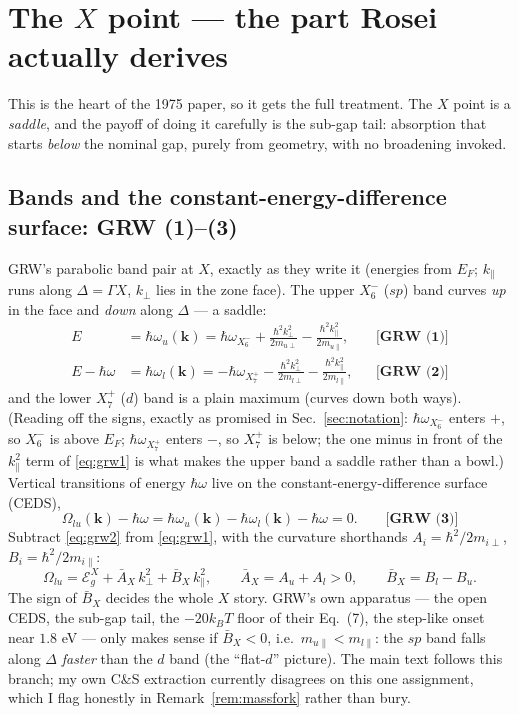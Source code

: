 \documentclass[11pt,a4paper]{article}
\numberwithin{equation}{section}
\newcommand{\hw}{\hbar\omega}
\newcommand{\EgX}{\mathcal{E}_g^{X}}
\newcommand{\AX}{\bar{A}_X}
\newcommand{\BX}{\bar{B}_X}
\newcommand{\kperp}{k_{\perp}}
\newcommand{\kpar}{k_{\parallel}}
\newcommand{\wXsix}{\hbar\omega_{X_6^-}}
\newcommand{\wXseven}{\hbar\omega_{X_7^+}}
\newcommand{\grweq}[1]{\textbf{[GRW~(#1)]}}
\begin{document}
\section{The $X$ point --- the part Rosei actually derives}\label{sec:X}

This is the heart of the 1975 paper, so it gets the full treatment.
The $X$ point is a \emph{saddle}, and the payoff of doing it carefully
is the sub-gap tail: absorption that starts \emph{below} the nominal
gap, purely from geometry, with no broadening invoked.

\subsection{Bands and the constant-energy-difference surface: GRW (1)--(3)}

GRW's parabolic band pair at $X$, exactly as they write it (energies
from $E_F$; $\kpar$ runs along $\Delta=\Gamma X$, $\kperp$ lies in the
zone face). The upper $X_6^-$ ($sp$) band curves \emph{up} in the face
and \emph{down} along $\Delta$ --- a saddle:
\begin{align}
E&=\hbar\omega_u(\mathbf k)
=\wXsix+\frac{\hbar^2\kperp^2}{2m_{u\perp}}
        -\frac{\hbar^2\kpar^2}{2m_{u\parallel}},
&&\grweq{1}
\label{eq:grw1}\\[2pt]
E-\hw&=\hbar\omega_l(\mathbf k)
=-\wXseven-\frac{\hbar^2\kperp^2}{2m_{l\perp}}
          -\frac{\hbar^2\kpar^2}{2m_{l\parallel}},
&&\grweq{2}
\label{eq:grw2}
\end{align}
and the lower $X_7^+$ ($d$) band is a plain maximum (curves down both
ways). (Reading off the signs, exactly as promised in
Sec.~\ref{sec:notation}: $\wXsix$ enters $+$, so $X_6^-$ is above
$E_F$; $\wXseven$ enters $-$, so $X_7^+$ is below; the one minus in
front of the $\kpar^2$ term of \eqref{eq:grw1} is what makes the upper
band a saddle rather than a bowl.) Vertical transitions of energy
$\hw$ live on the constant-energy-difference surface (CEDS),
\begin{equation}
\Omega_{lu}(\mathbf k)-\hw=
\hbar\omega_u(\mathbf k)-\hbar\omega_l(\mathbf k)-\hw=0 .
\qquad\grweq{3}
\label{eq:grw3}
\end{equation}
Subtract \eqref{eq:grw2} from \eqref{eq:grw1}, with the curvature
shorthands $A_i=\hbar^2/2m_{i\perp}$, $B_i=\hbar^2/2m_{i\parallel}$:
\begin{equation}
\Omega_{lu}=\EgX+\AX\,\kperp^2+\BX\,\kpar^2,
\qquad
\AX=A_u+A_l>0,\qquad
\BX=B_l-B_u .
\label{eq:OmegaX}
\end{equation}
The sign of $\BX$ decides the whole $X$ story. GRW's own apparatus ---
the open CEDS, the sub-gap tail, the $-20k_BT$ floor of their
Eq.~(7), the step-like onset near $1.8$ eV --- only makes sense if
$\boxed{\BX<0}$, i.e.\ $m_{u\parallel}<m_{l\parallel}$: the $sp$ band
falls along $\Delta$ \emph{faster} than the $d$ band (the ``flat-$d$''
picture). The main text follows this branch; my own C\&S extraction
currently disagrees on this one assignment, which I flag honestly in
Remark~\ref{rem:massfork} rather than bury.
\end{document}
